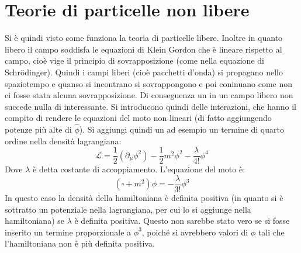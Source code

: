\documentclass[]{article}
\newcommand{\Lag}{\mathcal{L}}
\begin{document}
\section{Teorie di particelle non libere}

Si è quindi visto come funziona la teoria di particelle libere. Inoltre in quanto libero il campo soddisfa le equazioni di Klein Gordon che è lineare rispetto al campo, cioè vige il principio di sovrapposizione (come nella equazione di Schrödinger). Quindi i campi liberi (cioè pacchetti d'onda) si propagano nello spaziotempo e quanso si incontrano si sovrappongono e poi coninuano come non ci fosse stata alcuna sovrapposizione. Di conseguenza un in un campo libero non succede nulla di interessante. Si introducono quindi delle interazioni, che hanno il compito di rendere le equazioni del moto non lineari (di fatto aggiungendo potenze più alte di $\hat \phi$). Si aggiungi quindi un ad esempio un termine di quarto ordine nella densità lagrangiana:
\begin{equation}
 \Lag = \frac{1}{2} \left(  \partial_\mu \phi^ 2 \right)  -\frac{1}{2} m^2 \phi^2 -\frac{\lambda}{4!} \phi^4
\end{equation}
Dove $\lambda$ è detta costante di accoppiamento. L'equazione del moto è:
\begin{equation}
 \left( \square + m^2 \right) \phi = - \frac{\lambda}{3!} \phi^3
\end{equation}
In questo caso la densità della hamiltoniana è definita positiva (in quanto si è sottratto un potenziale nella lagrangiana, per cui lo si aggiunge nella hamiltoniana) se $\lambda$ è definita positiva. Questo non sarebbe stato vero se si fosse inserito un termine proporzionale a $\phi^3$, poiché si avrebbero valori di $\phi$ tali che l'hamiltoniana non è più definita positiva. \\
\end{document}
